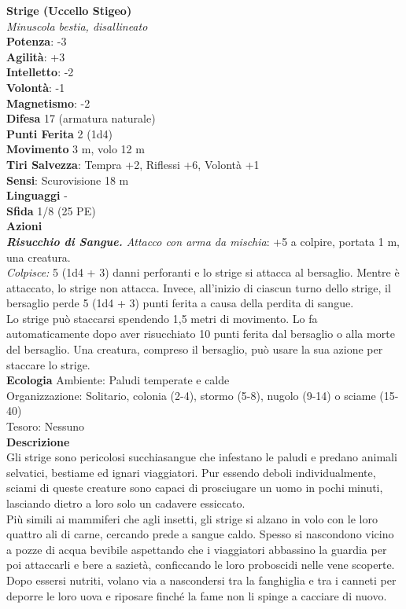 \begin{multicols}{2}
\medskip\textbf{Strige (Uccello Stigeo)}\\
\emph{Minuscola bestia, disallineato}\\
\textbf{Potenza}: -3\\
\textbf{Agilità}: +3\\
\textbf{Intelletto}: -2\\
\textbf{Volontà}: -1\\
\textbf{Magnetismo}: -2\\
\textbf{Difesa} 17 (armatura naturale)\\
\textbf{Punti Ferita} 2 (1d4)\\
\textbf{Movimento} 3 m, volo 12 m\\
\textbf{Tiri Salvezza}: Tempra +2, Riflessi +6, Volontà +1\\
\textbf{Sensi}: Scurovisione 18 m\\
\textbf{Linguaggi} -\\
\textbf{Sfida} 1/8 (25 PE)\smallskip\\
\smallskip\textbf{Azioni}\\
\emph{\textbf{Risucchio di Sangue.} Attacco con arma da mischia}: +5 a colpire, portata 1 m, una creatura.\\
\emph{Colpisce:} 5 (1d4 + 3) danni perforanti e lo strige si attacca al bersaglio. Mentre è attaccato, lo strige non attacca. Invece, all'inizio di ciascun turno dello strige, il bersaglio perde 5 (1d4 + 3) punti ferita a causa della perdita di sangue.\\
Lo strige può staccarsi spendendo 1,5 metri di movimento. Lo fa automaticamente dopo aver risucchiato 10 punti ferita dal bersaglio o alla morte del bersaglio. Una creatura, compreso il bersaglio, può usare la sua azione per staccare lo strige.\\
\textbf{Ecologia}
Ambiente: Paludi temperate e calde\\
Organizzazione: Solitario, colonia (2-4), stormo (5-8), nugolo (9-14) o sciame (15-40)\\
Tesoro: Nessuno\\
\textbf{Descrizione}\\
Gli strige sono pericolosi succhiasangue che infestano le paludi e predano animali selvatici, bestiame ed ignari viaggiatori. Pur essendo deboli individualmente, sciami di queste creature sono capaci di prosciugare un uomo in pochi minuti, lasciando dietro a loro solo un cadavere essiccato.\\

Più simili ai mammiferi che agli insetti, gli strige si alzano in volo con le loro quattro ali di carne, cercando prede a sangue caldo. Spesso si nascondono vicino a pozze di acqua bevibile aspettando che i viaggiatori abbassino la guardia per poi attaccarli e bere a sazietà, conficcando le loro proboscidi nelle vene scoperte. Dopo essersi nutriti, volano via a nascondersi tra la fanghiglia e tra i canneti per deporre le loro uova e riposare finché la fame non li spinge a cacciare di nuovo.\\


\end{multicols}
